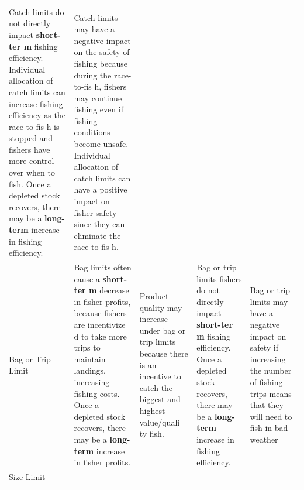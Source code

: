 \documentclass[]{book}
\begin{document}
\begin{longtable}[]{@{}lllll@{}}
\begin{minipage}[t]{0.17\columnwidth}
Catch limits do not directly impact \textbf{short-ter m} fishing
efficiency. Individual allocation of catch limits can increase fishing
efficiency as the race-to-fis h is stopped and fishers have more control
over when to fish. Once a depleted stock recovers, there may be a
\textbf{long-term } increase in fishing efficiency.\strut
\end{minipage} & \begin{minipage}[t]{0.17\columnwidth}\raggedright\strut
Catch limits may have a negative impact on the safety of fishing because
during the race-to-fis h, fishers may continue fishing even if fishing
conditions become unsafe. Individual allocation of catch limits can have
a positive impact on fisher safety since they can eliminate the
race-to-fis h.\strut
\end{minipage}\tabularnewline
\begin{minipage}[t]{0.17\columnwidth}\raggedright\strut
Bag or Trip Limit\strut
\end{minipage} & \begin{minipage}[t]{0.17\columnwidth}\raggedright\strut
Bag limits often cause a \textbf{short-ter m} decrease in fisher
profits, because fishers are incentivize d to take more trips to
maintain landings, increasing fishing costs. Once a depleted stock
recovers, there may be a \textbf{long-term } increase in fisher
profits.\strut
\end{minipage} & \begin{minipage}[t]{0.17\columnwidth}\raggedright\strut
Product quality may increase under bag or trip limits because there is
an incentive to catch the biggest and highest value/quali ty fish.\strut
\end{minipage} & \begin{minipage}[t]{0.17\columnwidth}\raggedright\strut
Bag or trip limits fishers do not directly impact \textbf{short-ter m}
fishing efficiency. Once a depleted stock recovers, there may be a
\textbf{long-term } increase in fishing efficiency.\strut
\end{minipage} & \begin{minipage}[t]{0.17\columnwidth}\raggedright\strut
Bag or trip limits may have a negative impact on safety if increasing
the number of fishing trips means that they will need to fish in bad
weather\strut
\end{minipage}\tabularnewline
\begin{minipage}[t]{0.17\columnwidth}\raggedright\strut
Size Limit\strut
\end{minipage} & \begin{minipage}[t]{0.17\columnwidth}\raggedright\strut

\end{minipage}
\end{longtable}
\end{document}
